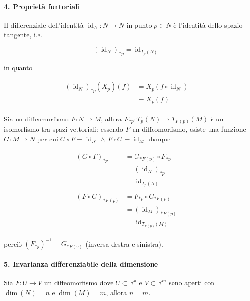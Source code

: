 \paragraph{4. Proprietà funtoriali}

Il differenziale dell'identità $ \operatorname{id}_{N} : N \to N $ in punto $ p \in N $ è l'identità dello spazio tangente, i.e.
	
\begin{equation}
	(\operatorname{id}_{N})_{*p} = \operatorname{id}_{T_{p}(N)}
\end{equation}

in quanto

\begin{align}
	\begin{split}
		(\operatorname{id}_{N})_{*p} (X_{p})(f) &= X_{p} (f \circ \operatorname{id}_{N})\\
		&= X_{p}(f)
	\end{split}
\end{align}

Sia un diffeomorfismo $ F : N \to M $, allora $ F_{*p} : T_{p}(N) \to T_{F(p)}(M) $ è un isomorfismo tra spazi vettoriali: essendo $ F $ un diffeomorfismo, esiste una funzione $ G : M \to N $ per cui $ G \circ F = \operatorname{id}_{N} \, \wedge \, F \circ G = \operatorname{id}_{M} $ dunque
	
\begin{align}
	\begin{split}
		(G \circ F)_{*p} &= G_{*F(p)} \circ F_{*p}\\
		&= (\operatorname{id}_{N})_{*p}\\
		&= \operatorname{id}_{T_{p}(N)}\\\\
		(F \circ G)_{*F(p)} &= F_{*p} \circ G_{*F(p)}\\
		&= (\operatorname{id}_{M})_{*F(p)}\\
		&= \operatorname{id}_{T_{F(p)}(M)}
	\end{split}
\end{align}

perciò $ (F_{*p})^{-1} = G_{*F(p)} $ (inversa destra e sinistra).

\paragraph{5. Invarianza differenziabile della dimensione}

\begin{theorem}
	Sia $ F : U \to V $ un diffeomorfismo dove $ U \subset \mathbb{R}^{n} $ e $ V \subset \mathbb{R}^{m} $ sono aperti con $ \dim(N)=n $ e $ \dim(M)=m $, allora $ n=m $.
\end{theorem}

